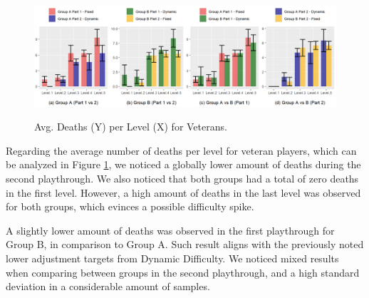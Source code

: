 \begin{figure}[!ht]
    \begin{center}
    \caption{Avg. Deaths (Y) per Level (X) for Veterans.}
        \includegraphics[width=\textwidth]{figures/deaths_per_level-veteran_players.png}
        \label{fig:result-metric-veterans-deaths-per-level}
    \end{center}
\end{figure}

Regarding the average number of deaths per level for veteran players, which can be analyzed in Figure \ref{fig:result-metric-veterans-deaths-per-level}, we noticed a globally lower amount of deaths during the second playthrough. We also noticed that both groups had a total of zero deaths in the first level. However, a high amount of deaths in the last level was observed for both groups, which evinces a possible difficulty spike.

A slightly lower amount of deaths was observed in the first playthrough for Group B, in comparison to Group A. Such result aligns with the previously noted lower adjustment targets from Dynamic Difficulty. We noticed mixed results when comparing between groups in the second playthrough, and a high standard deviation in a considerable amount of samples.


